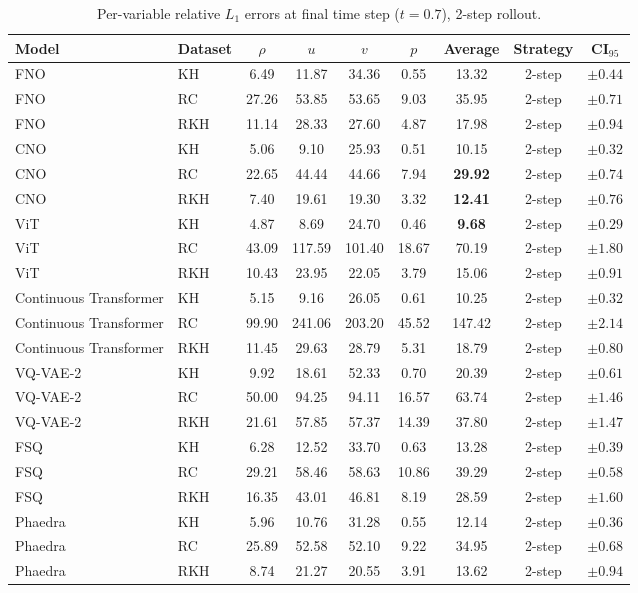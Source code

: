 \begin{table}[h]
    \centering
    \caption{Per-variable relative $L_1$ errors at final time step ($t=0.7$), 2-step rollout.}
    \begin{tabular}{llccccccc}
        \toprule
        Model & Dataset  & $\rho$ & $u$ & $v$ & $p$ & Average & Strategy & CI$_{95}$ \\
        \midrule
        FNO & KH & 6.49 & 11.87 & 34.36 & 0.55 & 13.32 & 2-step & $\pm0.44$ \\
        FNO & RC & 27.26 & 53.85 & 53.65 & 9.03 & 35.95 & 2-step & $\pm0.71$ \\
        FNO & RKH & 11.14 & 28.33 & 27.60 & 4.87 & 17.98 & 2-step & $\pm0.94$ \\
        \midrule
        CNO & KH & 5.06 & 9.10 & 25.93 & 0.51 & 10.15 & 2-step & $\pm0.32$ \\
        CNO & RC & 22.65 & 44.44 & 44.66 & 7.94 & \textbf{29.92} & 2-step & $\pm0.74$ \\
        CNO & RKH & 7.40 & 19.61 & 19.30 & 3.32 & \textbf{12.41} & 2-step & $\pm0.76$ \\
        \midrule
        ViT & KH & 4.87 & 8.69 & 24.70 & 0.46 & \textbf{9.68} & 2-step & $\pm0.29$ \\
        ViT & RC & 43.09 & 117.59 & 101.40 & 18.67 & 70.19 & 2-step & $\pm1.80$ \\
        ViT & RKH & 10.43 & 23.95 & 22.05 & 3.79 & 15.06 & 2-step & $\pm0.91$ \\
        \midrule
        Continuous Transformer & KH & 5.15 & 9.16 & 26.05 & 0.61 & 10.25 & 2-step & $\pm0.32$ \\
        Continuous Transformer & RC & 99.90 & 241.06 & 203.20 & 45.52 & 147.42 & 2-step & $\pm2.14$ \\
        Continuous Transformer & RKH & 11.45 & 29.63 & 28.79 & 5.31 & 18.79 & 2-step & $\pm0.80$ \\
        \midrule
        VQ-VAE-2 & KH & 9.92 & 18.61 & 52.33 & 0.70 & 20.39 & 2-step & $\pm0.61$ \\
        VQ-VAE-2 & RC & 50.00 & 94.25 & 94.11 & 16.57 & 63.74 & 2-step & $\pm1.46$ \\
        VQ-VAE-2 & RKH & 21.61 & 57.85 & 57.37 & 14.39 & 37.80 & 2-step & $\pm1.47$ \\
        \midrule
        FSQ & KH & 6.28 & 12.52 & 33.70 & 0.63 & 13.28 & 2-step & $\pm0.39$ \\
        FSQ & RC & 29.21 & 58.46 & 58.63 & 10.86 & 39.29 & 2-step & $\pm0.58$ \\
        FSQ & RKH & 16.35 & 43.01 & 46.81 & 8.19 & 28.59 & 2-step & $\pm1.60$ \\
        \midrule
        Phaedra & KH & 5.96 & 10.76 & 31.28 & 0.55 & 12.14 & 2-step & $\pm0.36$ \\
        Phaedra & RC & 25.89 & 52.58 & 52.10 & 9.22 & 34.95 & 2-step & $\pm0.68$ \\
        Phaedra & RKH & 8.74 & 21.27 & 20.55 & 3.91 & 13.62 & 2-step & $\pm0.94$ \\
        \bottomrule
    \end{tabular}
\end{table}
